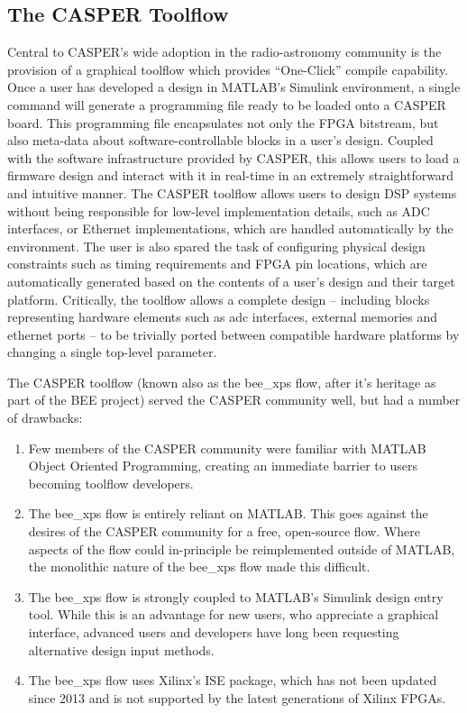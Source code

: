 \documentclass{ws-jai}
\begin{document}
\subsection{The CASPER Toolflow} \label{sec:toolflow}

Central to CASPER's wide adoption in the radio-astronomy community is the provision of a graphical toolflow which provides ``One-Click'' compile capability. Once a user has developed a design in MATLAB's Simulink environment, a single command will generate a programming file ready to be loaded onto a CASPER board. This programming file encapsulates not only the FPGA bitstream, but also meta-data about software-controllable blocks in a user's design. Coupled with the software infrastructure provided by CASPER, this allows users to load a firmware design and interact with it in real-time in an extremely straightforward and intuitive manner.
The CASPER toolflow allows users to design DSP systems without being responsible for low-level implementation details, such as ADC interfaces, or Ethernet implementations, which are handled automatically by the environment. The user is also spared the task of configuring physical design constraints such as timing requirements and FPGA pin locations, which are automatically generated based on the contents of a user's design and their target platform. Critically, the toolflow allows a complete design -- including blocks representing hardware elements such as adc interfaces, external memories and ethernet ports -- to be trivially ported between compatible hardware platforms by changing a single top-level parameter.

The CASPER toolflow (known also as the bee\_xps flow, after it's heritage as part of the BEE project) served the CASPER community well, but had a number of drawbacks:
\begin{enumerate}
 \item Few members of the CASPER community were familiar with MATLAB Object Oriented Programming, creating an immediate barrier to users becoming toolflow developers.
 \item The bee\_xps flow is entirely reliant on MATLAB. This goes against the desires of the CASPER community for a free, open-source flow. Where aspects of the flow could in-principle be reimplemented outside of MATLAB, the monolithic nature of the bee\_xps flow made this difficult.
 \item The bee\_xps flow is strongly coupled to MATLAB's Simulink design entry tool. While this is an advantage for new users, who appreciate a graphical interface, advanced users and developers have long been requesting alternative design input methods.
 \item The bee\_xps flow uses Xilinx's ISE package, which has not been updated since 2013 and is not supported by the latest generations of Xilinx FPGAs.
\end{enumerate}
\end{document}

